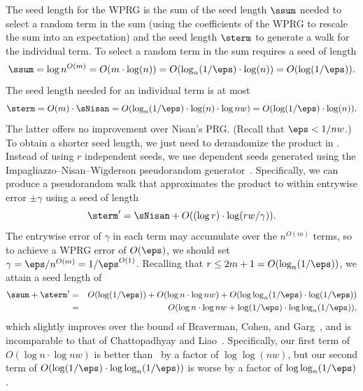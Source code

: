     The seed length
    for the WPRG is the sum of the seed length $\ssum$ needed to select a random term in the sum (using the coefficients of the WPRG to rescale the sum into an expectation) and the seed length $\sterm$ to generate a walk for the individual term.
    To select a random term in the sum requires a seed of length
    $$\ssum = \log n^{O(m)}=O(m\cdot \log(n))=O(\log_{n}(1/\eps)\cdot\log(n))=O(\log(1/\eps)).$$
    The seed length needed for an individual term is at most $$\sterm = O(m)\cdot \sNisan=O(\log_{n}(1/\eps)\cdot \log(n)\cdot\log nw) = O(\log(1/\eps)\cdot \log(n)).$$ 
    The latter offers no improvement over Nisan's PRG. (Recall that $\eps<1/nw$.) To obtain a shorter seed length, we just need to derandomize the product in .  Instead of using $r$ independent seeds, we use dependent seeds generated using the Impagliazzo--Nisan--Wigderson pseudorandom generator~\cite{ImpagliazzoNiWi94}.  Specifically, we can produce a pseudorandom walk that approximates the product to within entrywise error $\pm \gamma$ using a seed of length 
    $$\sterm' = \sNisan+O((\log r)\cdot \log(rw/\gamma)).$$
    The entrywise error of $\gamma$ in each term may accumulate over the $n^{O(m)}$ terms, so to achieve a WPRG error of $O(\eps)$, we should set $\gamma=\eps/n^{O(m)}=1/\eps^{O(1)}$.  Recalling that $r\leq 2m+1 = O(\log_{n}(1/\eps))$, we attain a seed length of
    \begin{eqnarray*}
    \ssum+\sterm' 
    &=& O(\log(1/\eps)) + O(\log n\cdot \log nw) + O(\log\log_{n}(1/\eps)\cdot \log(1/\eps))\\
    &=& O(\log n\cdot \log nw + \log(1/\eps)\cdot \log\log_{n}(1/\eps)),
    \end{eqnarray*}
    which slightly improves over the bound of Braverman, Cohen, and Garg~\cite{BravermanCoGa18}, and is incomparable to that of Chattopadhyay and Liao~\cite{ChattopadhyayLi20}. Specifically, our first term of $O(\log n\cdot \log nw)$ is better than~\cite{ChattopadhyayLi20} by a factor of $\log\log(nw)$, but our second term of $O(\log(1/\eps)\cdot \log\log_{n}(1/\eps))$ is worse by a factor of $\log\log_{n}(1/\eps)$.
    
